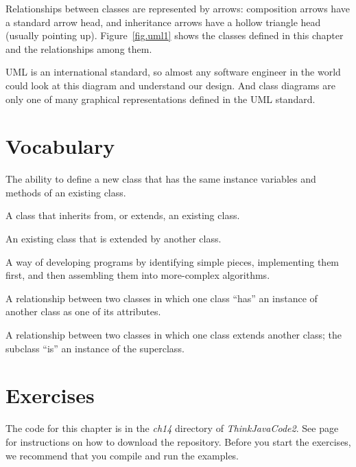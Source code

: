 Relationships between classes are represented by arrows: composition arrows have a standard arrow head, and inheritance arrows have a hollow triangle head (usually pointing up).
Figure~\ref{fig.uml1} shows the classes defined in this chapter and the relationships among them.

UML is an international standard, so almost any software engineer in the world could look at this diagram and understand our design.
And class diagrams are only one of many graphical representations defined in the UML standard.


\section{Vocabulary}

\begin{description}

The ability to define a new class that has the same instance variables and methods of an existing class.

A class that inherits from, or extends, an existing class.

An existing class that is extended by another class.


A way of developing programs by identifying simple pieces, implementing them first, and then assembling them into more-complex algorithms.

A relationship between two classes in which one class ``has'' an instance of another class as one of its attributes.

A relationship between two classes in which one class extends another class; the subclass ``is'' an instance of the superclass.

\end{description}


\section{Exercises}

The code for this chapter is in the {\it ch14} directory of {\it ThinkJavaCode2}.
See page~\pageref{code} for instructions on how to download the repository.
Before you start the exercises, we recommend that you compile and run the examples.


